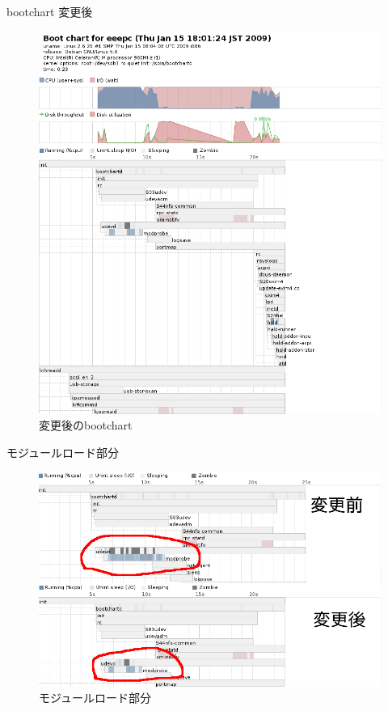 \begin{frame}{bootchart 変更後}
\begin{figure}
 \begin{center}
 \includegraphics[scale=1.0]{image200901/bootchart-eeepc-new.png}
 \caption{変更後のbootchart}
 \label{fig:bootchart-eeepc-new}
 \end{center}
\end{figure}

\end{frame}

\begin{frame}{モジュールロード部分}
\begin{figure}
 \begin{center}
 \includegraphics[scale=0.6]{image200901/bootchart-eeepc-merge.png}
 \caption{モジュールロード部分}
 \label{fig:bootchart-eeepc-merge}
 \end{center}
\end{figure}

\end{frame}


